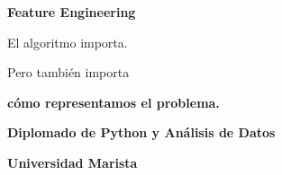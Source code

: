 \documentclass[aspectratio=169,11pt]{beamer}
\begin{document}
\begin{frame}

\begin{center}

{\Huge
\textcolor{azulmarista}{
\textbf{Feature Engineering}
}
}

\vspace{0.8cm}

{\Large
El algoritmo importa.
}

\vspace{0.4cm}

{\Large
Pero también importa
}

\vspace{0.3cm}

{\LARGE
\textbf{cómo representamos el problema.}
}

\vspace{0.8cm}

\textbf{Diplomado de Python y Análisis de Datos}

\vspace{0.2cm}

\textbf{Universidad Marista}

\end{center}

\end{frame}

\end{document}
